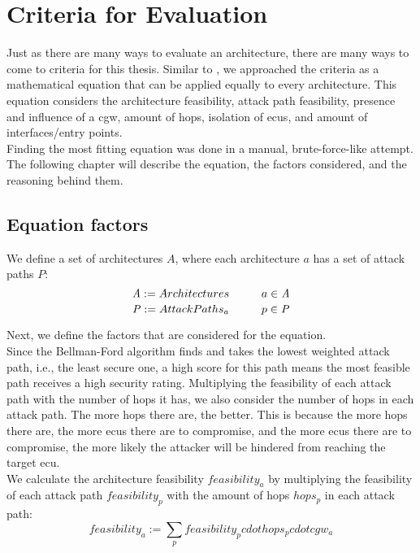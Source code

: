 \chapter{Criteria for Evaluation}
\label{chp:criteria}

Just as there are many ways to evaluate an architecture, there are many ways to come to criteria for this thesis.
Similar to \cite{threat_surf}, we approached the criteria as a mathematical equation that can be applied equally to every architecture.
This equation considers the architecture feasibility, attack path feasibility, presence and influence of a \acrshort{cgw},
amount of hops, isolation of \acrshort{ecu}s, and amount of interfaces/entry points.\\

Finding the most fitting equation was done in a manual, brute-force-like attempt.
The following chapter will describe the equation, the factors considered, and the reasoning behind them.\\

\section{Equation factors}
\label{sec:equation_factors}

We define a set of architectures $\mathit{A}$, where each architecture $a$ has a set of attack paths $\mathit{P}$:\\
\begin{equation}
    \mathit{A} := {Architectures} \hspace*{1cm} a \in \mathit{A} \label{eq:architectures}
\end{equation}
\begin{equation}
    \mathit{P} := {Attack Paths_{a}} \hspace*{1cm} p \in \mathit{P} \label{eq:attack_paths}
\end{equation}

\hfill \break

Next, we define the factors that are considered for the equation.\\

Since the Bellman-Ford algorithm finds and takes the lowest weighted attack path, i.e., the least secure one, 
a high score for this path means the most feasible path receives a high security rating.
Multiplying the feasibility of each attack path with the number of hops it has, we also consider the number of hops in each attack path.
The more hops there are, the better.
This is because the more hops there are, the more \acrshort{ecu}s there are to compromise, 
and the more \acrshort{ecu}s there are to compromise, the more likely the attacker will be hindered from reaching the target \acrshort{ecu}.\\
We calculate the architecture feasibility $feasibility_{a}$ by multiplying the feasibility of each attack path $feasibility_{p}$ with the amount of hops $hops_{p}$ in each attack path:
\begin{equation}
    feasibility_{a} := \sum_{p} feasibility_{p} cdot  hops_{p} cdot  cgw_{a} \label{eq:feasibility}
\end{equation}

